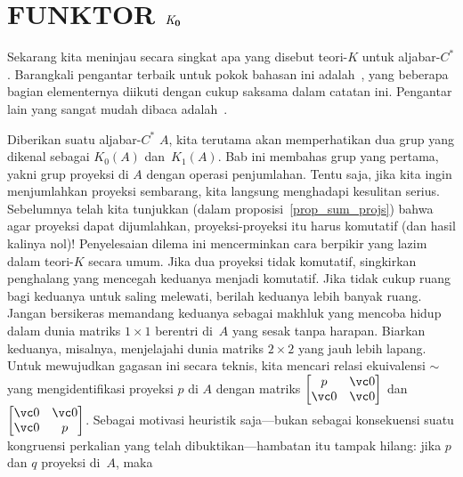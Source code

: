 \chapter{FUNKTOR $\mathbf{\emph{K}_0}$}

Sekarang kita meninjau secara singkat apa yang disebut teori-$K$ untuk aljabar-$C^*$. Barangkali pengantar terbaik untuk pokok bahasan ini adalah~\cite{RordamLL:2000},
yang beberapa bagian elementernya diikuti dengan cukup saksama dalam catatan ini. Pengantar lain yang sangat mudah dibaca adalah~\cite{Wegge-Olsen:1993}.

Diberikan suatu aljabar-$C^*$ $A$, kita terutama akan memperhatikan dua grup yang dikenal sebagai $K_0(A)$ dan~$K_1(A)$. Bab ini membahas
grup yang pertama, yakni grup proyeksi di $A$ dengan operasi penjumlahan. Tentu saja, jika kita ingin menjumlahkan proyeksi sembarang, kita langsung
menghadapi kesulitan serius. Sebelumnya telah kita tunjukkan (dalam proposisi~\ref{prop_sum_projs}) bahwa agar proyeksi dapat dijumlahkan, proyeksi-proyeksi itu harus komutatif
(dan hasil kalinya nol)! Penyelesaian dilema ini mencerminkan cara berpikir yang lazim dalam teori-$K$ secara umum. Jika dua proyeksi tidak
komutatif, singkirkan penghalang yang mencegah keduanya menjadi komutatif. Jika tidak cukup ruang bagi keduanya untuk saling melewati, berilah keduanya lebih banyak
ruang. Jangan bersikeras memandang keduanya sebagai makhluk yang mencoba hidup dalam dunia matriks $1 \times 1$ berentri di~$A$ yang sesak tanpa harapan.
Biarkan keduanya, misalnya, menjelajahi dunia matriks $2 \times 2$ yang jauh lebih lapang. %
Untuk mewujudkan gagasan ini secara teknis, kita mencari relasi ekuivalensi $\sim$ yang mengidentifikasi proyeksi $p$ di $A$ dengan matriks $\begin{bmatrix} p & \vc 0 \\ \vc 0 & \vc 0 \end{bmatrix}$
dan $\begin{bmatrix} \vc 0 & \vc 0 \\ \vc 0 & p \end{bmatrix}$. Sebagai motivasi heuristik saja---bukan sebagai konsekuensi suatu kongruensi perkalian yang telah dibuktikan---hambatan itu tampak hilang: jika $p$ dan $q$ proyeksi di~$A$, maka %
